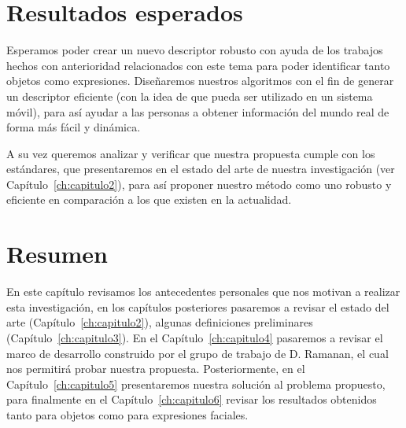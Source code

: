 \section{Resultados esperados}
Esperamos poder crear un nuevo descriptor robusto con ayuda de los trabajos hechos con anterioridad relacionados con este tema para poder identificar tanto objetos como expresiones. Diseñaremos nuestros algoritmos con el fin de generar un descriptor eficiente (con la idea de que pueda ser utilizado en un sistema móvil), para así ayudar a las personas a obtener información del mundo real de forma más fácil y dinámica.

A su vez queremos analizar y verificar que nuestra propuesta cumple con los estándares, que presentaremos en el estado del arte de nuestra investigación (ver Capítulo~\ref{ch:capitulo2}), para así proponer nuestro método como uno robusto y eficiente en comparación a los que existen en la actualidad.

\section{Resumen}

En este capítulo revisamos los antecedentes personales que nos motivan a realizar esta investigación, en los capítulos posteriores pasaremos a revisar el estado del arte (Capítulo~\ref{ch:capitulo2}), algunas definiciones preliminares (Capítulo~\ref{ch:capitulo3}). En el Capítulo~\ref{ch:capitulo4} pasaremos a revisar el marco de desarrollo construido por el grupo de trabajo de D. Ramanan, el cual nos permitirá probar nuestra propuesta. Posteriormente, en el Capítulo~\ref{ch:capitulo5} presentaremos nuestra solución al problema propuesto, para finalmente en el Capítulo~\ref{ch:capitulo6} revisar los resultados obtenidos tanto para objetos como para expresiones faciales.